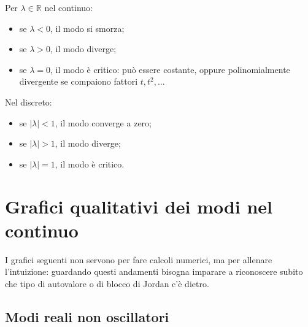 Per $\lambda\in\mathbb{R}$ nel continuo:
\begin{itemize}
    \item se $\lambda<0$, il modo si smorza;
    \item se $\lambda>0$, il modo diverge;
    \item se $\lambda=0$, il modo è critico: può essere costante, oppure polinomialmente divergente se compaiono fattori $t, t^2,\dots$
\end{itemize}

Nel discreto:
\begin{itemize}
    \item se $|\lambda|<1$, il modo converge a zero;
    \item se $|\lambda|>1$, il modo diverge;
    \item se $|\lambda|=1$, il modo è critico.
\end{itemize}

\section{Grafici qualitativi dei modi nel continuo}

I grafici seguenti non servono per fare calcoli numerici, ma per allenare l'intuizione: guardando questi andamenti bisogna imparare a riconoscere subito che tipo di autovalore o di blocco di Jordan c'è dietro.

\subsection{Modi reali non oscillatori}

